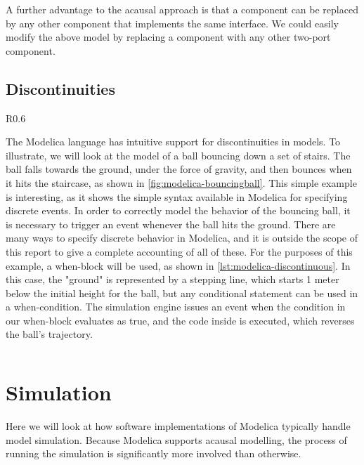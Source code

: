 \documentclass[\rootfolder/main.tex]{subfiles}
\begin{document}
A further advantage to the acausal approach is that a component can be replaced by any other component that implements the same interface.
We could easily modify the above model by replacing a component with any other two-port component.

\subsection{Discontinuities}

\begin{wrapfigure}{R}{0.6\columnwidth}
    \caption{Ball bouncing down stairs.\label{fig:modelica-bouncingball}}
\end{wrapfigure}

The Modelica language has intuitive support for discontinuities in models.
To illustrate, we will look at the model of a ball bouncing down a set of stairs.
The ball falls towards the ground, under the force of gravity, and then bounces when it hits the staircase, as shown in \cref{fig:modelica-bouncingball}.
This simple example is interesting, as it shows the simple syntax available in Modelica for specifying discrete events.
In order to correctly model the behavior of the bouncing ball, it is necessary to trigger an event whenever the ball hits the ground.
There are many ways to specify discrete behavior in Modelica, and it is outside the scope of this report to give a complete accounting of all of these.
For the purposes of this example, a when-block will be used, as shown in \cref{lst:modelica-discontinuous}.
In this case, the "ground" is represented by a stepping line, which starts 1 meter below the initial height for the ball, but any conditional statement can be used in a when-condition.
The simulation engine issues an event when the condition in our when-block evaluates as true, and the code inside is executed, which reverses the ball's trajectory.

\begin{listing}[ht]
    \inputminted{Modelica}{\rootfolder/Models/MasterProject/Models/BouncingBall.mo}
    \caption{Bouncing ball model showing discontinuous equation\label{lst:modelica-discontinuous}}
\end{listing}

\section{Simulation}

Here we will look at how software implementations of Modelica typically handle model simulation.
Because Modelica supports acausal modelling, the process of running the simulation is significantly more involved than otherwise.
\end{document}
